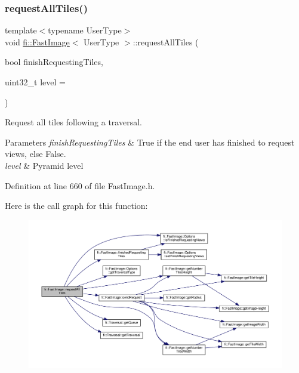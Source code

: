 \subsubsection{\texorpdfstring{request\+All\+Tiles()}{requestAllTiles()}}
{\footnotesize\ttfamily template$<$typename User\+Type$>$ \\
void \hyperlink{classfi_1_1FastImage}{fi\+::\+Fast\+Image}$<$ User\+Type $>$\+::request\+All\+Tiles (\begin{DoxyParamCaption}\item[{bool}]{finish\+Requesting\+Tiles,  }\item[{uint32\+\_\+t}]{level = {} }\end{DoxyParamCaption})\hspace{0.3cm}{\ttfamily [inline]}}



Request all tiles following a traversal. 


\begin{DoxyParams}{Parameters}
{\em finish\+Requesting\+Tiles} & True if the end user has finished to request views, else False. \\
\hline
{\em level} & Pyramid level \\
\hline
\end{DoxyParams}


Definition at line 660 of file Fast\+Image.\+h.

Here is the call graph for this function\+:
\nopagebreak
\begin{figure}[H]
\begin{center}
\leavevmode
\includegraphics[width=350pt]{dc/d6b/classfi_1_1FastImage_a81c5c39784220efcebce2121a6552e53_cgraph}
\end{center}
\end{figure}
\mbox{\label{classfi_1_1FastImage_abd44908134edad1df4a61faec9cdbf9e}} 
